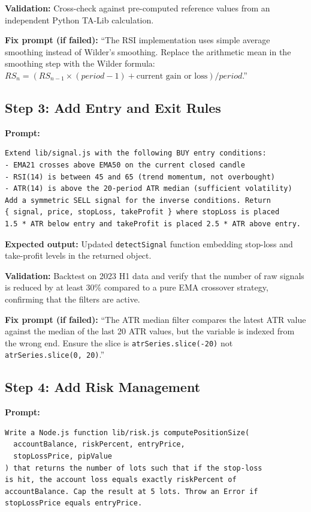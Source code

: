 \documentclass[conference]{IEEEtran}
\begin{document}
\textbf{Validation:} Cross-check against pre-computed reference
values from an independent Python TA-Lib calculation.

\textbf{Fix prompt (if failed):} ``The RSI implementation uses simple
average smoothing instead of Wilder's smoothing.  Replace the
arithmetic mean in the smoothing step with the Wilder formula:
$RS_n = (RS_{n-1} \times (period-1) + \text{current gain or loss})
/ period$.''

\subsection{Step 3: Add Entry and Exit Rules}

\textbf{Prompt:}
\begin{lstlisting}
Extend lib/signal.js with the following BUY entry conditions:
- EMA21 crosses above EMA50 on the current closed candle
- RSI(14) is between 45 and 65 (trend momentum, not overbought)
- ATR(14) is above the 20-period ATR median (sufficient volatility)
Add a symmetric SELL signal for the inverse conditions. Return
{ signal, price, stopLoss, takeProfit } where stopLoss is placed
1.5 * ATR below entry and takeProfit is placed 2.5 * ATR above entry.
\end{lstlisting}

\textbf{Expected output:} Updated \texttt{detectSignal} function
embedding stop-loss and take-profit levels in the returned object.

\textbf{Validation:} Backtest on 2023 H1 data and verify that the
number of raw signals is reduced by at least 30\% compared to a pure
EMA crossover strategy, confirming that the filters are active.

\textbf{Fix prompt (if failed):} ``The ATR median filter compares the
latest ATR value against the median of the last 20 ATR values, but
the variable is indexed from the wrong end.  Ensure the slice is
\texttt{atrSeries.slice(-20)} not \texttt{atrSeries.slice(0, 20)}.''

\subsection{Step 4: Add Risk Management}

\textbf{Prompt:}
\begin{lstlisting}
Write a Node.js function lib/risk.js computePositionSize(
  accountBalance, riskPercent, entryPrice,
  stopLossPrice, pipValue
) that returns the number of lots such that if the stop-loss
is hit, the account loss equals exactly riskPercent of
accountBalance. Cap the result at 5 lots. Throw an Error if
stopLossPrice equals entryPrice.
\end{lstlisting}
\end{document}
